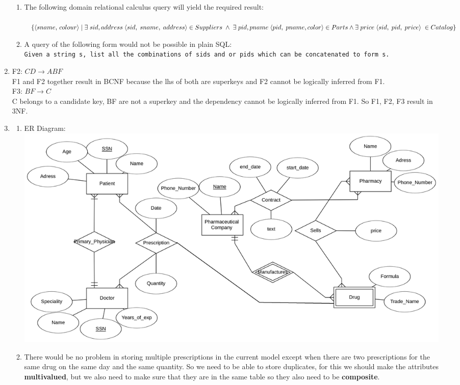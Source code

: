 \documentclass[12pt]{article}
\begin{document}
\begin{enumerate}
\begin{enumerate}
\item The following domain relational calculus query will yield the required result:\\\\
$ \{ \langle sname,\,colour \rangle \; | \; \exists \; sid,address \; \langle sid,\; sname,\; address\rangle \in Suppliers \; \land \; \exists \; pid, pname \\\; \langle pid, \;pname, color \rangle \in Parts  \land  \exists \; price\; \langle sid,\;pid,\; price \rangle \; \in Catalog \} $\\
\item A query of the following form would not be possible in plain SQL:\\
\texttt{Given a string s, list all the combinations of sids and or pids which can be concatenated to form s.} 
\end{enumerate}
\item F2: $CD \rightarrow ABF $\\
F1 and F2 together result in BCNF because the lhs of both are superkeys and F2 cannot be logically inferred from F1.\\
F3: $BF \rightarrow C $\\
C belongs to a candidate key, BF are not a superkey and the dependency cannot be logically inferred from F1. So F1, F2, F3 result in 3NF.
\item 
\begin{enumerate}
\item ER Diagram:\\\includegraphics[scale=0.12]{erd.png}
\item There would be no problem in storing multiple prescriptions in the current model except when there are two prescriptions for the same drug on the same day and the same quantity. So we need to be able to store duplicates, for this we should make the attributes \textbf{multivalued}, but we also need to make sure that they are in the same table so they also need to be \textbf{composite}.
\end{enumerate}
\end{enumerate}
\end{document}
